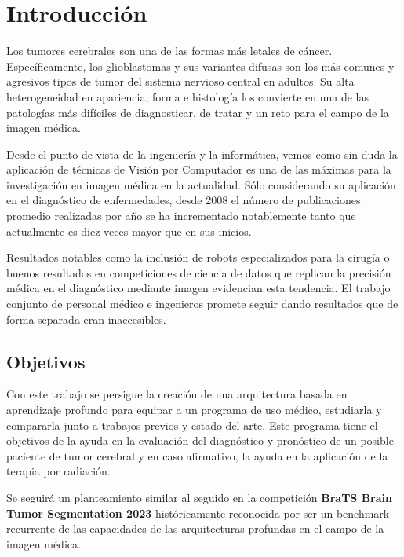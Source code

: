 \chapter{Introducción}

Los tumores cerebrales son una de las formas más letales de cáncer. Específicamente, los glioblastomas y sus variantes difusas son los más comunes y agresivos tipos de tumor del sistema nervioso central en adultos. Su alta heterogeneidad en apariencia, forma e histología los convierte en una de las patologías más difíciles de diagnosticar, de tratar y un reto para el campo de la imagen médica.

Desde el punto de vista de la ingeniería y la informática, vemos como sin duda la aplicación de técnicas de Visión por Computador es una de las máximas para la investigación en imagen médica en la actualidad. Sólo considerando su aplicación en el diagnóstico de enfermedades, desde 2008 el número de publicaciones promedio realizadas por año se ha incrementado notablemente tanto que actualmente es diez veces mayor que en sus inicios. 

Resultados notables como la inclusión de robots especializados para la cirugía \cite{cheng2022vinci} o buenos resultados en competiciones de ciencia de datos que replican la precisión médica en el diagnóstico mediante imagen \cite{bulten2022artificial} evidencian esta tendencia. El trabajo conjunto de personal médico e ingenieros promete seguir dando resultados que de forma separada eran inaccesibles.



\section{Objetivos}


Con este trabajo se persigue la creación de una arquitectura basada en aprendizaje profundo para equipar a un programa de uso médico, estudiarla y compararla junto a trabajos previos y estado del arte. Este programa tiene el objetivos de la ayuda en la evaluación del diagnóstico y pronóstico de un posible paciente de tumor cerebral y en caso afirmativo, la ayuda en la aplicación de la terapia por radiación. 

Se seguirá un planteamiento similar al seguido en la competición \textbf{BraTS Brain Tumor Segmentation 2023} \cite{baid2021rsna} históricamente reconocida por ser un benchmark recurrente de las capacidades de las arquitecturas profundas en el campo de la imagen médica.

